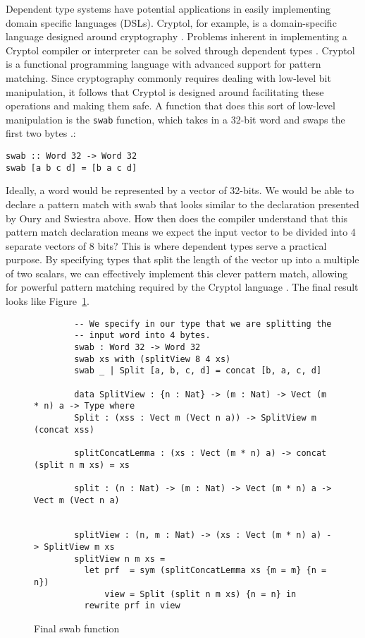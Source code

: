 Dependent type systems have potential applications in easily implementing domain
specific languages (DSLs). Cryptol, for example, is a domain-specific language
designed around cryptography \cite{cryptol_manual}. Problems inherent in
implementing a Cryptol compiler or interpreter can be solved through dependent
types \cite{power_of_pi}. Cryptol is a functional programming language with
advanced support for pattern matching. Since cryptography commonly requires
dealing with low-level bit manipulation, it follows that Cryptol is designed
around facilitating these operations and making them safe. A function that does
this sort of low-level manipulation is the \texttt{swab} function, which takes
in a 32-bit word and swaps the first two bytes \cite{cryptol_manual}.: 

\texttt{swab :: Word 32 -> Word 32} \\
\texttt{swab [a b c d] = [b a c d]}

Ideally, a word would be represented by a vector of 32-bits. We would be able to
declare a pattern match with swab that looks similar to the declaration
presented by Oury and Swiestra above. How then does the compiler understand that
this pattern match declaration means we expect the input vector to be divided
into 4 separate vectors of 8 bits? This is where dependent types serve a
practical purpose. By specifying types that split the length of the vector up
into a multiple of two scalars, we can effectively implement this clever pattern
match, allowing for powerful pattern matching required by the Cryptol language
\cite{power_of_pi}. The final result looks like Figure~\ref{swab}. 

\begin{figure}[ht!]
    \caption{Final swab function \protect\cite{power_of_pi}}
    \label{swab}
    \begin{lstlisting}
        -- We specify in our type that we are splitting the
        -- input word into 4 bytes. 
        swab : Word 32 -> Word 32
        swab xs with (splitView 8 4 xs)
        swab _ | Split [a, b, c, d] = concat [b, a, c, d]

        data SplitView : {n : Nat} -> (m : Nat) -> Vect (m * n) a -> Type where
        Split : (xss : Vect m (Vect n a)) -> SplitView m (concat xss)
        
        splitConcatLemma : (xs : Vect (m * n) a) -> concat (split n m xs) = xs
        
        split : (n : Nat) -> (m : Nat) -> Vect (m * n) a -> Vect m (Vect n a)


        splitView : (n, m : Nat) -> (xs : Vect (m * n) a) -> SplitView m xs
        splitView n m xs =
          let prf  = sym (splitConcatLemma xs {m = m} {n = n})
              view = Split (split n m xs) {n = n} in
          rewrite prf in view
    \end{lstlisting}
\end{figure}

